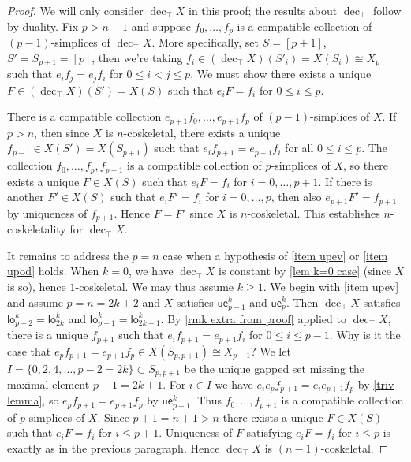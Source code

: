 \documentclass{amsart}
\newcommand{\lowod}{\mathsf{lo}}
\newcommand{\uppev}{\mathsf{ue}}
\newcommand{\decbot}{\operatorname{dec}_\bot}
\newcommand{\dectop}{\operatorname{dec}_\top}
\theoremstyle{definition}
\theoremstyle{remark}
\begin{document}
\begin{proof}
We will only consider $\dectop X$ in this proof; the results about $\decbot$ follow by duality.
Fix $p > n-1$ and suppose $f_0, \dots, f_p$ is a compatible collection of $(p-1)$-simplices of $\dectop X$.
More specifically, set $S = [p+1]$, $S' = S_{p+1} = [p]$, then we're taking $f_i \in (\dectop X)(S'_i) = X(S_i) \cong X_{p}$ such that $e_i f_j = e_j f_i$ for $0 \leq i < j \leq p$.
We must show there exists a unique $F \in (\dectop X)(S') = X(S)$ such that $e_i F = f_i$ for $0\leq i \leq p$.

There is a compatible collection $e_{p+1} f_0, \dots, e_{p+1} f_p$ of $(p-1)$-simplices of $X$. %
If $p > n$, then since $X$ is $n$-coskeletal, there exists a unique $f_{p+1} \in X(S') = X(S_{p+1})$ such that $e_i f_{p+1} = e_{p+1} f_i$ for all $0 \leq i \leq p$.
The collection $f_0, \dots, f_p, f_{p+1}$ is a compatible collection of $p$-simplices of $X$, so there exists a unique $F \in X(S)$ such that $e_i F = f_i$ for $i=0, \dots, p+1$.
If there is another $F' \in X(S)$ such that $e_i F' = f_i$ for $i=0, \dots, p$, then also $e_{p+1} F' = f_{p+1}$ by uniqueness of $f_{p+1}$.
Hence $F=F'$ since $X$ is $n$-coskeletal.
This establishes $n$-coskeletality for $\dectop X$.


It remains to address the $p=n$ case when a hypothesis of \eqref{item upev} or \eqref{item upod} holds.
When $k=0$, we have $\dectop X$ is constant by \cref{lem k=0 case} (since $X$ is so), hence $1$-coskeletal. 
We may thus assume $k \geq 1$.
We begin with \eqref{item upev} and assume $p=n=2k+2$ and $X$ satisfies $\uppev^k_{p-1}$ and $\uppev^k_p$. 
Then $\dectop X$ satisfies $\lowod^k_{p-2} = \lowod^k_{2k}$ and $\lowod^k_{p-1} = \lowod^k_{2k+1}$.
By \cref{rmk extra from proof} applied to $\dectop X$, there is a unique $f_{p+1}$ such that $e_i f_{p+1} = e_{p+1} f_i$ for $0 \leq i \leq p-1$.
Why is it the case that $e_p f_{p+1} = e_{p+1} f_p \in X(S_{p,p+1}) \cong X_{p-1}$?
We let $I = \{0, 2, 4, \dots, p-2=2k\} \subset S_{p,p+1}$ be the unique gapped set missing the maximal element $p-1=2k+1$.
For $i\in I$ we have %
$e_i e_p f_{p+1} = e_i e_{p+1} f_p$ by \cref{triv lemma}, so $e_p f_{p+1} = e_{p+1} f_p$ by $\uppev_{p-1}^k$. 
Thus $f_0, \dots, f_{p+1}$ is a compatible collection of $p$-simplices of $X$. 
Since $p+1 = n+1 > n$ there exists a unique $F\in X(S)$ such that $e_i F = f_i$ for $i \leq p+1$.
Uniqueness of $F$ satisfying $e_i F = f_i$ for $i \leq p$ is exactly as in the previous paragraph.
Hence $\dectop X$ is $(n{-}1)$-coskeletal.


\end{proof}
\end{document}
